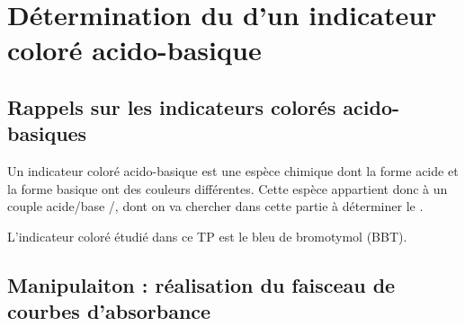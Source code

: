 \documentclass{tp}
\begin{document}
\section{Détermination du \pKa{} d'un indicateur coloré acido-basique}

\subsection{Rappels sur les indicateurs colorés acido-basiques}%
\label{sub:rappels_sur_les_indicateurs_colores_acido_basiques}
Un indicateur coloré acido-basique est une espèce chimique dont la forme acide  et la forme basique  ont des couleurs différentes. Cette espèce appartient donc à un couple acide/base /, dont on va chercher dans cette partie à déterminer le \pKa.

L'indicateur coloré étudié dans ce TP est le bleu de bromotymol (BBT).

\subsection{Manipulaiton : réalisation du faisceau de courbes d'absorbance}%
\label{sub:manipulaiton_realisation_du_faisceau_de_courbes_d_absorbance}


\end{document}
